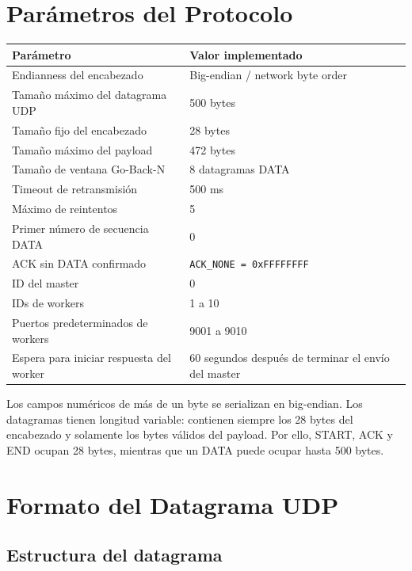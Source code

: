\documentclass[12pt]{article}
\begin{document}
\section{Parámetros del Protocolo}

\begin{table}[h]
\centering
\begin{tabular}{|p{6cm}|p{8cm}|}
\hline
Parámetro & Valor implementado \\
\hline
Endianness del encabezado & Big-endian / network byte order \\
\hline
Tamaño máximo del datagrama UDP & 500 bytes \\
\hline
Tamaño fijo del encabezado & 28 bytes \\
\hline
Tamaño máximo del payload & 472 bytes \\
\hline
Tamaño de ventana Go-Back-N & 8 datagramas DATA \\
\hline
Timeout de retransmisión & 500 ms \\
\hline
Máximo de reintentos & 5 \\
\hline
Primer número de secuencia DATA & 0 \\
\hline
ACK sin DATA confirmado & \texttt{ACK\_NONE = 0xFFFFFFFF} \\
\hline
ID del master & 0 \\
\hline
IDs de workers & 1 a 10 \\
\hline
Puertos predeterminados de workers & 9001 a 9010 \\
\hline
Espera para iniciar respuesta del worker & 60 segundos después de terminar el envío del master \\
\hline
\end{tabular}
\end{table}

Los campos numéricos de más de un byte se serializan en big-endian. Los
datagramas tienen longitud variable: contienen siempre los 28 bytes del
encabezado y solamente los bytes válidos del payload. Por ello, START, ACK y
END ocupan 28 bytes, mientras que un DATA puede ocupar hasta 500 bytes.

\section{Formato del Datagrama UDP}

\subsection{Estructura del datagrama}
\end{document}
